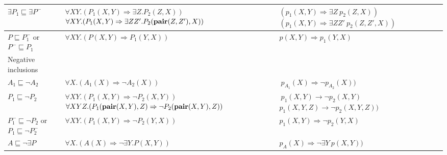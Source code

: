 \begin{longtable}{| p{2cm} | p{8.2cm} | p{5.2cm} |}
	\hline	
		$\exists P_1\sqsubseteq \exists P^{-}$		
		&
		$\forall X Y. (P_1(X,Y) \Rightarrow \exists Z. P_2(Z,X)) $ \newline
		$\forall X  Y. (P_1(X,Y) \Rightarrow \exists Z Z'. P_2(\pair{Z,Z'},X)) $
		&
		$ (p_1(X,Y) \Rightarrow \exists Z~ p_2(Z,X)) $ %
		$ (p_1(X,Y) \Rightarrow \exists Z Z'~p_2(Z,Z',X)) $

	\\
	
	\hline
		$P \sqsubseteq P_1^{-}$ or $P^{-} \sqsubseteq P_1$		
		&
		$\forall X Y. (P(X,Y) \Rightarrow P_1(Y,X)) $
		&
$p(X,Y) \Rightarrow p_1(Y,X) $
	\\
	
	\hline	
		Negative inclusions & &
	\\
	
	\hline
		$A_1 \sqsubseteq \neg A_2$	
		&
		$\forall X. (A_1(X) \Rightarrow \neg A_2(X)) $
		&
$\ p_{A_1}(X) \Rightarrow \neg p_{A_2}(X)) $
	\\
	
	\hline
		$P_1 \sqsubseteq \neg P_2$	
		&
		$\forall X  Y. (P_1(X,Y) \Rightarrow \neg P_2(X,Y)) $ \newline
		$\forall X  Y  Z.(P_1(\pair{X,Y},Z) \Rightarrow \neg P_2(\pair{X,Y},Z)) $
		&
$\ p_1(X,Y) \rightarrow \neg p_2(X,Y) $ \newline
		$p_1(X,Y,Z) \rightarrow \neg p_2(X,Y,Z)) $
	\\
	
	\hline
		$P_1^{-} \sqsubseteq \neg P_2$	or $P_1 \sqsubseteq \neg P_2^{-}$
		&
		$\forall X Y .(P_1(X,Y) \Rightarrow \neg P_2(Y,X)) $
		&
		$p_1(X,Y) \Rightarrow \neg p_2(Y,X)$
	\\
	
	\hline
		$A \sqsubseteq \neg \exists P$
		&
		$\forall X. (A(X) \Rightarrow \neg \exists Y. P(X,Y)) $
		&
$p_A(X) \Rightarrow \neg \exists Y~p(X,Y)) $
	\\
	

\end{longtable}
